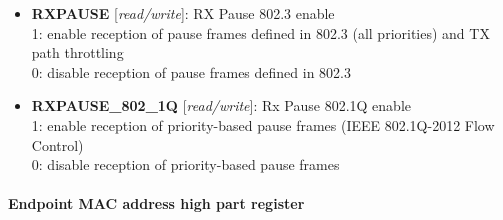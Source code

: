 \vspace{12pt}


\vspace{12pt}
\noindent
{}

\begin{itemize}
\item \begin{small}
{\bf 
RXPAUSE
} [\emph{read/write}]: RX Pause 802.3 enable
\\
1: enable reception of pause frames defined in 802.3 (all priorities) and TX path throttling \\                       0: disable reception of pause frames defined in 802.3
\end{small}
\item \begin{small}
{\bf 
RXPAUSE\_802\_1Q
} [\emph{read/write}]: Rx Pause 802.1Q enable
\\
1: enable reception of priority-based pause frames (IEEE 802.1Q-2012 Flow Control)  \\						0: disable reception of priority-based pause frames
\end{small}
\end{itemize}
\paragraph*{Endpoint MAC address high part register}\vspace{12pt}

